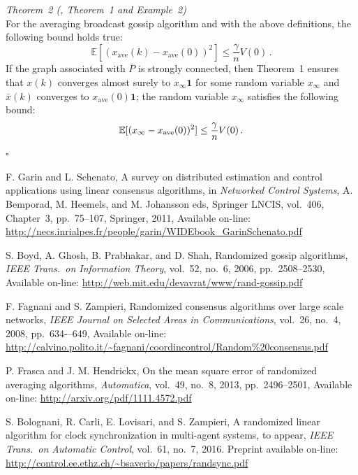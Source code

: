 \documentclass{article}
\begin{document}
	\textit{Theorem~2 (\cite{gossip-small-error}, Theorem~1 and Example~2)}\\
For the averaging broadcast gossip algorithm and with the above definitions, the following bound holds true:
\[ \mathbb E [ (x_{\text{ave}}(k) - x_{\text{ave}}(0))^2 ] \le
 \frac{\gamma}{n} V(0)  \, .\]
If the graph associated with $\bar P$ is strongly connected, then Theorem~1 ensures that
$x(k)$ converges almost surely to $x_{\infty} \mathbf 1$ for some random variable $x_{\infty}$ and $\bar x(k)$ converges to $x_{\text{ave}}(0) \mathbf 1$;  the random variable $x_{\infty}$ satisfies the following bound:
\[ \mathbb E [ (x_{\infty} - x_{\text{ave}}(0))^2 ] \le
\frac{\gamma}{n} V(0)\,. \vspace{-2mm}\]
\hfill $\square$
%
%



\begin{thebibliography}{99}

F. Garin and L. Schenato, A survey on distributed estimation and control applications using linear consensus algorithms, in {\it Networked Control Systems}, A. Bemporad, M. Heemels, and M. Johansson eds, Springer LNCIS, vol.~406, Chapter~3, pp.~75--107, Springer, 2011, Available on-line: \url{http://necs.inrialpes.fr/people/garin/WIDEbook_GarinSchenato.pdf}


S. Boyd, A. Ghosh, B. Prabhakar, and D. Shah, Randomized gossip algorithms, {\it IEEE Trans.\ on Information Theory}, vol.~52, no.~6, 2006, pp.~2508--2530, Available on-line: \url{http://web.mit.edu/devavrat/www/rand-gossip.pdf}


F. Fagnani and S. Zampieri, Randomized consensus algorithms over large scale networks,
{\it IEEE Journal on Selected Areas in Communications}, vol.~26, no.~4, 2008, pp.~634-–649, Available on-line:
\url{http://calvino.polito.it/~fagnani/coordincontrol/Random%20consensus.pdf}

P. Frasca and J. M. Hendrickx, On the mean square error of randomized averaging algorithms, {\it Automatica}, vol.~49, no.~8, 2013, pp.~2496--2501, Available on-line: \url{http://arxiv.org/pdf/1111.4572.pdf}

S. Bolognani, R. Carli, E. Lovisari, and S. Zampieri,
A randomized linear algorithm for clock synchronization in multi-agent systems,
to appear, {\it IEEE Trans.\ on Automatic Control}, vol.~61, no.~7, 2016.
Preprint available on-line:
\url{http://control.ee.ethz.ch/~bsaverio/papers/randsync.pdf}


\end{thebibliography}
\end{document}

